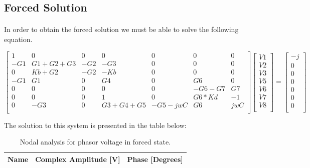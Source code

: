 \subsection{Forced Solution}

\paragraph{} In order to obtain the forced solution we must be able to solve the following equation.  

\begin{equation}
\begin{bmatrix}
1 & 0 & 0 & 0 & 0 & 0 & 0\\
-G1 & G1+G2+G3 & -G2 & -G3 & 0 & 0 & 0\\
0 & Kb+G2 & -G2 & -Kb & 0 & 0 & 0\\
-G1 & G1 & 0 & G4 & 0 & G6 & 0\\
0 & 0 & 0 & 0 & 0 & -G6-G7 & G7\\
0 & 0 & 0 & 1 & 0 & G6*Kd & -1\\
0 & -G3 & 0 & G3+G4+G5 & -G5-jwC & G6 & jwC\\
\end{bmatrix}
\begin{bmatrix}
V1\\
V2\\
V3\\
V5\\
V6\\
V7\\
V8\\
\end{bmatrix}
=
\begin{bmatrix}
-j\\
0\\
0\\
0\\
0\\
0\\
0\\
\end{bmatrix}
\end{equation}


The solution to this system is presented in the table below:


\begin{table}[h]
  \centering
  \begin{tabular}{|l|r|r|}
    \hline    
    {\bf Name} & {\bf Complex Amplitude [V]} & {\bf Phase [Degrees]}\\ \hline
     
  \end{tabular}
  \caption{Nodal analysis for phasor voltage in forced state.}
  \label{tab:phasor}
\end{table}


